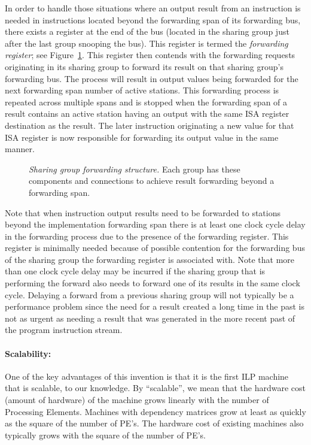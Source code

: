 \documentclass[10pt,dvips]{article}
\begin{document}
In order to handle
those situations where an output result from an instruction is
needed in instructions located beyond the forwarding span of its
forwarding bus, there exists a register at the end of the bus (located
in the sharing group just after the last group snooping the bus).  This register is
termed the {\it forwarding register}; see Figure~\ref{shareforward}.
This register then contends
with the forwarding requests originating in its sharing group to
forward its result on that sharing group's forwarding bus.  The process
will result in output values being forwarded for the next forwarding
span number of active stations.  This forwarding process is repeated
across multiple spans and is stopped
when the forwarding
span of a result contains an active station having an output with
the same ISA register destination as the result.
The later instruction originating a
new value for that ISA register is now responsible for forwarding its
output value in the same manner.

\begin{figure}
\centering
{}
\caption{{\em Sharing group forwarding structure.}
Each group has these components and connections to achieve
result forwarding beyond a forwarding span.}
\label{shareforward}
\end{figure}


Note that when instruction output results need to be forwarded to
stations beyond the implementation forwarding span there is at least
one clock cycle delay in the forwarding process due to the presence of
the forwarding register.  This register is minimally needed because of
possible contention for the forwarding bus of the sharing group the
forwarding register is associated with.  Note that more than one clock cycle
delay may
be incurred if the sharing group that is performing the forward also
needs to forward one of its results in the same clock cycle.  Delaying
a forward from a previous sharing group will not typically be a
performance problem since the need for a result created a long time in
the past is not as urgent as needing a result that was generated in the
more recent past of the program instruction stream.

\paragraph{Scalability: }
One of the key advantages of this invention is that it is the first
ILP machine
that is scalable, to our knowledge. By ``scalable'', we mean that the
hardware cost (amount of hardware) of the machine grows linearly with
the number of Processing
Elements. Machines with dependency matrices grow at least as quickly as
the square of the number of PE's. The hardware cost of existing machines
also typically grows with the square of the number of PE's.
\end{document}

